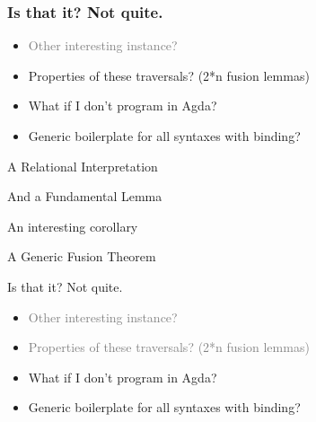 \documentclass[xetex, mathserif, serif]{beamer}
\begin{document}
  \begin{frame}\frametitle{Is that it? Not quite.}
    \begin{itemize}
      \item \textcolor{gray}{Other interesting instance?}
      \item Properties of these traversals? (2*n fusion lemmas)
      \item What if I don't program in Agda?
      \item Generic boilerplate for all syntaxes with binding?
    \end{itemize}
  \end{frame}

  \begin{frame}{A Relational Interpretation}
    \vspace{-2.5em}
  \end{frame}

  \begin{frame}{And a Fundamental Lemma}
  \end{frame}

  \begin{frame}{An interesting corollary}
  \end{frame}
  
  \begin{frame}{A Generic Fusion Theorem}
    \vspace{-1.8em}
    \vspace{-1.8em}
    \vspace{-1.8em}
    \unskip
  \end{frame}

  \begin{frame}{Is that it? Not quite.}
    \begin{itemize}
      \item \textcolor{gray}{Other interesting instance?}
      \item \textcolor{gray}{Properties of these traversals? (2*n fusion lemmas)}
      \item What if I don't program in Agda?
      \item Generic boilerplate for all syntaxes with binding?
    \end{itemize}
  \end{frame}
\end{document}
